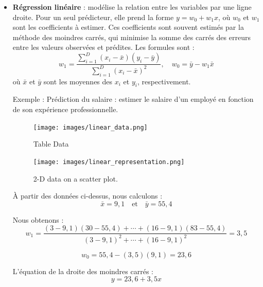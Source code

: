 \documentclass[a4paper,12pt]{report}
\begin{document}
\begin{itemize}
    \item \textbf{Régression linéaire} : modélise la relation entre les variables par une ligne droite. Pour un seul prédicteur, elle prend la forme \( y = w_0 + w_1 x \), où \( w_0 \) et \( w_1 \) sont les coefficients à estimer. Ces coefficients sont souvent estimés par la méthode des moindres carrés, qui minimise la somme des carrés des erreurs entre les valeurs observées et prédites. Les formules sont :
    \[
    w_1 = \frac{\sum_{i=1}^D (x_i - \bar{x})(y_i - \bar{y})}{\sum_{i=1}^D (x_i - \bar{x})^2}, \quad w_0 = \bar{y} - w_1 \bar{x}
    \]
    où \( \bar{x} \) et \( \bar{y} \) sont les moyennes des \( x_i \) et \( y_i \), respectivement.


    Exemple : Prédiction du salaire : estimer le salaire d’un employé en fonction de son expérience professionnelle.

    \begin{figure}[h!]
        \begin{minipage}[b]{0.5\textwidth}
            \centering
            \texttt{[image: images/linear\_data.png]} 
            \caption{Table Data}
        \end{minipage}%
        \begin{minipage}[b]{0.5\textwidth}
            \centering
            \texttt{[image: images/linear\_representation.png]} 
            \caption{2-D data on a scatter plot.}
        \end{minipage}
    \end{figure}

        \begin{minipage}[t]{0.48\textwidth} %
        \vspace{0pt} %
        
        À partir des données ci-dessus, nous calculons :
        \[
        \bar{x} = 9{,}1 \quad \text{et} \quad \bar{y} = 55{,}4
        \]
        
        Nous obtenons :
        \[
        w_1 = \frac{(3 - 9{,}1)(30 - 55{,}4) + \cdots + (16 - 9{,}1)(83 - 55{,}4)}{(3 - 9{,}1)^2 + \cdots + (16 - 9{,}1)^2} = 3{,}5
        \]
        
        \[
        w_0 = 55{,}4 - (3{,}5)(9{,}1) = 23{,}6
        \]
        
        L'équation de la droite des moindres carrés :
        \[
        y = 23{,}6 + 3{,}5x
        \]
        

\end{minipage}
\end{itemize}
\end{document}
